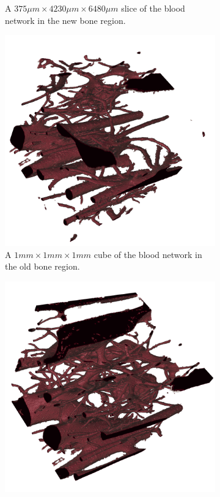 \begin{figure}
\begin{subfigure}[b]{\linewidth}
        \caption{A $375\mu m \times 4230\mu m \times 6480\mu m$ slice of the blood network in the new bone region.}
        \label{fig:blood-new-slice}
    \end{subfigure}
    \begin{subfigure}[b]{.48\linewidth}
    \centering
        \includegraphics[width=.9\linewidth,height=\linewidth]{generated/figure10_old_cube.png}
        \caption{A $1mm \times 1 mm \times 1 mm$ cube of the blood network in the old bone region.}
        \label{fig:blood-old-cube}
    \end{subfigure}
    \hfill
    \begin{subfigure}[b]{.48\linewidth}
    \centering
        \includegraphics[width=.9\linewidth,height=\linewidth]{generated/figure10_new_cube.png}

\end{subfigure}
\end{figure}
